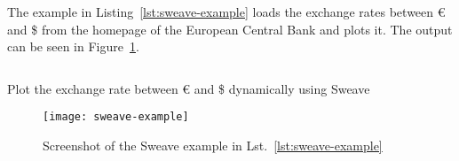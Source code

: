 The example in Listing~\ref{lst:sweave-example} loads the exchange rates between
\euro{} and \$ from the homepage of the European Central Bank and plots it. The
output can be seen in Figure~\ref{fig:sweave-example}.

\begin{listing}[H]
  \inputminted{latex}{../examples/sweave-example.Snw}
  \caption{Plot the exchange rate between \euro{} and \$ dynamically using
    Sweave}
  \label{lst:sweave-example}
\end{listing}
\begin{figure}[t]
  \texttt{[image: sweave-example]}
  \caption{Screenshot of the Sweave example in Lst.~\ref{lst:sweave-example}}
  \label{fig:sweave-example}
\end{figure}
